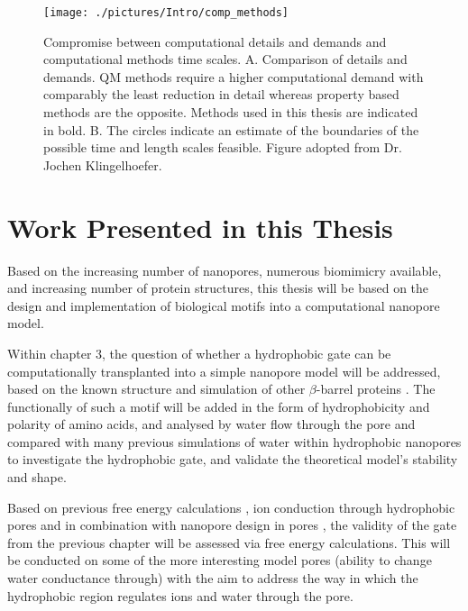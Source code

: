 \begin{figure}[H]
\begin{center}
\texttt{[image: ./pictures/Intro/comp\_methods]}
\caption[Compromise between computational details and demands and computational methods time scales.] {Compromise between computational details and demands and computational methods time scales. A. Comparison of details and demands. QM methods require a higher computational demand with comparably the least reduction in detail whereas property based methods are the opposite. Methods used in this thesis are indicated in bold. B. The circles indicate an estimate of the boundaries of the possible time and length scales feasible. Figure adopted from Dr. Jochen Klingelhoefer. }
\label{fig:comp_methods}
\end{center}
\end{figure}

\section{Work Presented in this Thesis}

Based on the increasing number of nanopores, numerous biomimicry available, and increasing number of protein structures, this thesis will be based on the design and implementation of biological motifs into a computational nanopore model. 

Within chapter 3, the question of whether a hydrophobic gate can be computationally transplanted into a simple nanopore model will be addressed, based on the known structure and simulation of other $\beta$-barrel proteins \cite{Ziervogel2013c,Aksimentiev2005a,Wells2007,Luo2010}. The functionally of such a motif will be added in the form of hydrophobicity and polarity of amino acids, and analysed by water flow through the pore and compared with many previous simulations of water within hydrophobic nanopores \cite{Hummer2001,Beckstein2003a,Allen2003g,Dzubiella2005,Peter2005,Smirnov2010,
Chiavazzo2014b} to investigate the hydrophobic gate, and validate the theoretical model's stability and shape.

Based on previous free energy calculations \cite{Pongprayoon2009,Rui2011,Modi2012d,Modi2014}, ion conduction through hydrophobic pores \cite{Song2009,Thomas2014} and in combination with nanopore design in pores \cite{Pongprayoon2012,Garcia-Fandino2012b,Corry2011c}, the validity of the gate from the previous chapter will be assessed via free energy calculations. This will be conducted on some of the more interesting model pores (ability to change water conductance through) with the aim to address the way in which the hydrophobic region regulates ions and water through the pore. 

